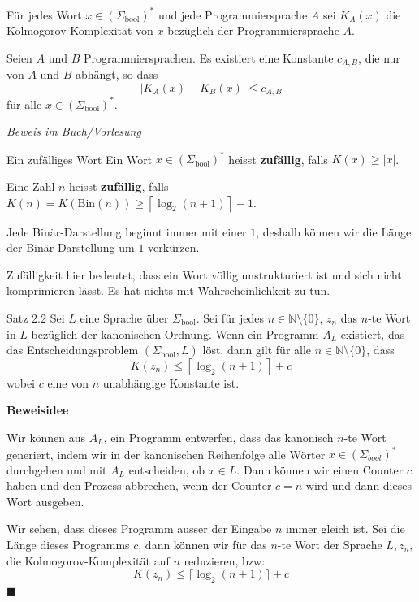 \documentclass[a4paper, 11pt]{article}
\def\N{\mathbb{N}}
\begin{document}
        Für jedes Wort $x \in (\Sigma_{\text{bool}})^*$ und jede Programmiersprache $A$ sei $K_A(x)$ die Kolmogorov-Komplexität von $x$ bezüglich der Programmiersprache $A$.
        \begin{mainbox}{}
            Seien $A$ und $B$ Programmiersprachen. Es existiert eine Konstante $c_{A,B}$, die nur von $A$ und $B$ abhängt, so dass 
            $$|K_A(x) -K_B(x)|\leq c_{A,B}$$
            für alle $x \in (\Sigma_{\text{bool}})^*$.
        \end{mainbox}
        \textit{Beweis im Buch/Vorlesung}
    
        \begin{mainbox}{Ein zufälliges Wort}
            Ein Wort $x \in (\Sigma_{\text{bool}})^*$ heisst \textbf{zufällig}, falls $K(x) \geq |x|$. 
            
            Eine Zahl $n$ heisst \textbf{zufällig}, falls $K(n) = K(\text{Bin}(n)) \geq \left\lceil\log_2(n + 1) \right\rceil - 1$.
        \end{mainbox}
        Jede Binär-Darstellung beginnt immer mit einer $1$, deshalb können wir die Länge der Binär-Darstellung um $1$ verkürzen.
    
        Zufälligkeit hier bedeutet, dass ein Wort völlig unstrukturiert ist und sich nicht komprimieren lässt. Es hat nichts mit Wahrscheinlichkeit zu tun.
    
        \begin{mainbox}{Satz 2.2}
            Sei $L$ eine Sprache über $\Sigma_{\text{bool}}$. Sei für jedes $n \in \N \setminus \{0\}$, $z_n$ das $n$-te Wort in $L$ bezüglich der kanonischen Ordnung. 
            Wenn ein Programm $A_L$ existiert, das das Entscheidungsproblem $(\Sigma_{\text{bool}}, L)$ löst, dann gilt für alle $n \in \N\setminus\{0\}$, dass
            $$K(z_n) \leq \left\lceil\log_2(n+1)\right\rceil + c$$
            wobei $c$ eine von $n$ unabhängige Konstante ist.
        \end{mainbox}
        \textbf{Beweisidee}

        Wir können aus $A_L$, ein Programm entwerfen, dass das kanonisch $n$-te Wort generiert, indem wir in der kanonischen Reihenfolge alle Wörter $x \in (\Sigma_{bool})^*$ durchgehen und mit $A_L$ entscheiden, ob $x \in L$. Dann können wir einen Counter $c$ haben und den Prozess abbrechen, wenn der Counter $c = n$ wird und dann dieses Wort ausgeben.
    
        Wir sehen, dass dieses Programm ausser der Eingabe $n$ immer gleich ist. Sei die Länge dieses Programms $c$, dann können wir für das $n$-te Wort der Sprache $L, z_n,$ die Kolmogorov-Komplexität auf $n$ reduzieren, bzw:
        $$K(z_n) \leq \lceil \log_2(n+1)\rceil + c$$
        \hspace*{0pt}\hfill$\blacksquare$
    
\end{document}
